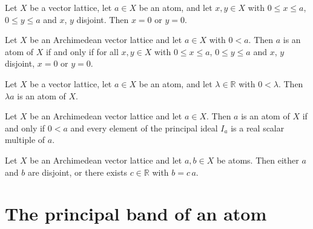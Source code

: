 \begin{lemma}
\label{lem:eq-zero-or-eq-zero-of-isVLDisjoint-of-isVLAtom}
\leanok
{}
Let $X$ be a vector lattice, let $a \in X$ be an atom, and let
$x, y \in X$ with $0 \le x \le a$, $0 \le y \le a$ and $x$, $y$
disjoint. Then $x = 0$ or $y = 0$.
\end{lemma}

\begin{theorem}
\label{thm:isVLAtom-iff-no-disjoint-in-interval}
\leanok
{}
Let $X$ be an Archimedean vector lattice and let $a \in X$ with
$0 < a$. Then $a$ is an atom of $X$ if and only if for all
$x, y \in X$ with $0 \le x \le a$, $0 \le y \le a$ and $x$, $y$
disjoint, $x = 0$ or $y = 0$.
\end{theorem}

\begin{lemma}
\label{lem:isVLAtom-smul}
\leanok
{}
Let $X$ be a vector lattice, let $a \in X$ be an atom, and let
$\lambda \in \mathbb{R}$ with $0 < \lambda$. Then $\lambda a$ is an
atom of $X$.
\end{lemma}

\begin{theorem}
\label{thm:isVLAtom-iff-principal-eq-span}
\leanok
{}
Let $X$ be an Archimedean vector lattice and let $a \in X$. Then
$a$ is an atom of $X$ if and only if $0 < a$ and every element of
the principal ideal $I_a$ is a real scalar multiple of $a$.
\end{theorem}

\begin{theorem}
\label{thm:isVLDisjoint-or-smul-of-isVLAtom}
\leanok
{}
Let $X$ be an Archimedean vector lattice and let $a, b \in X$ be
atoms. Then either $a$ and $b$ are disjoint, or there exists
$c \in \mathbb{R}$ with $b = c\,a$.
\end{theorem}

\section{The principal band of an atom}

